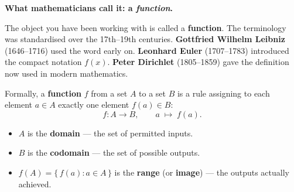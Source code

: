 \documentclass[12pt, a4paper]{article}
\begin{document}
\begin{namebox}
\textbf{What mathematicians call it: a \emph{function}.}

The object you have been working with is called a \textbf{function}. The terminology was standardised over the 17th--19th centuries. \textbf{Gottfried Wilhelm Leibniz} (1646--1716) used the word early on. \textbf{Leonhard Euler} (1707--1783) introduced the compact notation $f(x)$. \textbf{Peter Dirichlet} (1805--1859) gave the definition now used in modern mathematics.

\medskip
Formally, a \textbf{function} $f$ from a set $A$ to a set $B$ is a rule assigning to each element $a \in A$ exactly one element $f(a) \in B$:
\[
  f : A \longrightarrow B, \qquad a \;\longmapsto\; f(a).
\]

\begin{itemize}[topsep=4pt]
  \item $A$ is the \textbf{domain} --- the set of permitted inputs.
  \item $B$ is the \textbf{codomain} --- the set of possible outputs.
  \item $f(A) = \{\, f(a) : a \in A \,\}$ is the \textbf{range} (or \textbf{image}) --- the outputs actually achieved.
\end{itemize}

\begin{center}
\end{center}
\end{namebox}
\end{document}
